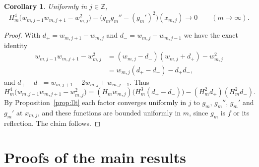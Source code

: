 \documentclass{amsart}
\newtheorem{corollary}[theorem]{Corollary}
\theoremstyle{definition}
\theoremstyle{remark}
\numberwithin{equation}{section}
\newcommand{\Z}{\mathbb{Z}}
\begin{document}
\begin{corollary}\label{cor:curvature}
Uniformly in $j\in\Z$,
\[
H_m^4\bigl(w_{m,j-1}w_{m,j+1}-w_{m,j}^2\bigr)-\bigl(g_mg_m''-(g_m')^2\bigr)(x_{m,j})\to0\qquad(m\to\infty).
\]
\end{corollary}

\begin{proof}
With $d_+=w_{m,j+1}-w_{m,j}$ and $d_-=w_{m,j}-w_{m,j-1}$ we have the exact identity
\[
\begin{split}
w_{m,j-1}w_{m,j+1}-w_{m,j}^2&=(w_{m,j}-d_-)(w_{m,j}+d_+)-w_{m,j}^2\\
&=w_{m,j}(d_+-d_-)-d_+d_-,
\end{split}
\]
and $d_+-d_-=w_{m,j+1}-2w_{m,j}+w_{m,j-1}$. Thus
\[
H_m^4\bigl(w_{m,j-1}w_{m,j+1}-w_{m,j}^2\bigr)=(H_mw_{m,j})\bigl(H_m^3(d_+-d_-)\bigr)-(H_m^2d_+)(H_m^2d_-).
\]
By Proposition~\ref{prop:llt} each factor converges uniformly in $j$ to $g_m$, $g_m''$, $g_m'$ and $g_m'$ at $x_{m,j}$, and these functions are bounded uniformly in $m$, since $g_m$ is $f$ or its reflection. The claim follows.
\end{proof}

\section{Proofs of the main results}\label{sec:proof}
\end{document}
